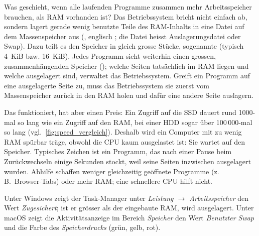 Was geschieht, wenn alle laufenden Programme zusammen mehr Arbeitsspeicher brauchen, als \gls{RAM} vorhanden ist? Das Betriebssystem bricht nicht einfach ab, sondern lagert gerade wenig benutzte Teile des RAM-Inhalts in eine Datei auf dem Massenspeicher aus (, englisch ; die Datei heisst Auslagerungsdatei oder Swap). Dazu teilt es den Speicher in gleich grosse Stücke, sogenannte  (typisch 4~KiB bzw. 16~KiB). Jedes Programm sieht weiterhin einen grossen, zusammenhängenden Speicher (); welche Seiten tatsächlich im \gls{RAM} liegen und welche ausgelagert sind, verwaltet das Betriebssystem. Greift ein Programm auf eine ausgelagerte Seite zu, muss das Betriebssystem sie zuerst vom Massenspeicher zurück in den \gls{RAM} holen und dafür eine andere Seite auslagern.

Das funktioniert, hat aber einen Preis: Ein Zugriff auf die \gls{SSD} dauert rund 1000-mal so lang wie ein Zugriff auf den \gls{RAM}, bei einer \gls{HDD} sogar über 100\,000-mal so lang (vgl.\ \cref{fig:speed_vergleich}). Deshalb wird ein Computer mit zu wenig \gls{RAM} spürbar träge, obwohl die \gls{CPU} kaum ausgelastet ist: Sie wartet auf den Speicher. Typisches Zeichen ist ein Programm, das nach einer Pause beim Zurückwechseln einige Sekunden stockt, weil seine Seiten inzwischen ausgelagert wurden. Abhilfe schaffen weniger gleichzeitig geöffnete Programme (z.\,B.\ Browser-Tabs) oder mehr \gls{RAM}; eine schnellere \gls{CPU} hilft nicht.

\begin{myexample}
    Unter Windows zeigt der Task-Manager unter \emph{Leistung $\to$ Arbeitsspeicher} den Wert \emph{Zugesichert}; ist er grösser als der eingebaute \gls{RAM}, wird ausgelagert. Unter macOS zeigt die Aktivitätsanzeige im Bereich \emph{Speicher} den Wert \emph{Benutzter Swap} und die Farbe des \emph{Speicherdrucks} (grün, gelb, rot).
\end{myexample}

